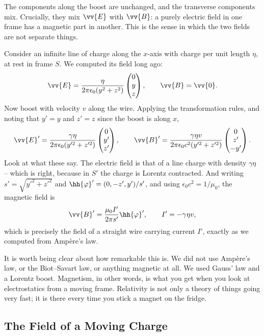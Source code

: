 The components along the boost are unchanged, and the transverse components mix. Crucially, they mix $\vv{E}$ with $\vv{B}$: a purely electric field in one frame has a magnetic part in another. This is the sense in which the two fields are not separate things.

\begin{example}
	Consider an infinite line of charge along the $x$-axis with charge per unit length $\eta$, at rest in frame $S$. We computed its field long ago:
	$$
	\vv{E} = \frac{\eta}{2\pi\epsilon_0(y^2+z^2)}\begin{pmatrix} 0\\ y\\ z\end{pmatrix}, \qquad \vv{B} = \vv{0}.
	$$
	Now boost with velocity $v$ along the wire. Applying the transformation rules, and noting that $y' = y$ and $z' = z$ since the boost is along $x$,
	$$
	\vv{E}' = \frac{\gamma\eta}{2\pi\epsilon_0(y'^2+z'^2)}\begin{pmatrix} 0\\y'\\z'\end{pmatrix}, \qquad \vv{B}' = \frac{\gamma \eta v}{2\pi\epsilon_0 c^2 (y'^2+z'^2)}\begin{pmatrix} 0\\ z'\\ -y'\end{pmatrix}.
	$$
	Look at what these say. The electric field is that of a line charge with density $\gamma\eta$ -- which is right, because in $S'$ the charge is Lorentz contracted. And writing $s' = \sqrt{y'^2+z'^2}$ and $\hh{\varphi}' = (0,-z',y')/s'$, and using $\epsilon_0 c^2 = 1/\mu_0$, the magnetic field is
	$$
	\vv{B}' = \frac{\mu_0 I'}{2\pi s'}\hh{\varphi}', \qquad I' = -\gamma\eta v,
	$$
	which is precisely the field of a straight wire carrying current $I'$, exactly as we computed from Amp\`ere's law.

	It is worth being clear about how remarkable this is. We did not use Amp\`ere's law, or the Biot--Savart law, or anything magnetic at all. We used Gauss' law and a Lorentz boost. Magnetism, in other words, is what you get when you look at electrostatics from a moving frame. Relativity is not only a theory of things going very fast; it is there every time you stick a magnet on the fridge.
\end{example}

\subsection{The Field of a Moving Charge}

